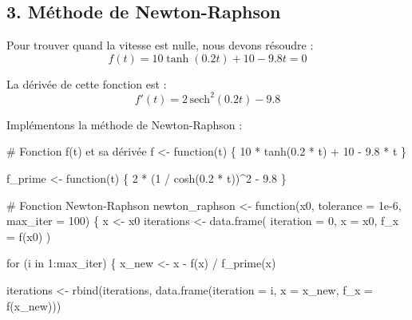 \documentclass[
  12pt,
  letterpaper,
]{book}
\newenvironment{Shaded}{}{}
\newcommand{\AttributeTok}[1]{\textcolor[rgb]{0.84,0.23,0.29}{#1}}
\newcommand{\CommentTok}[1]{\textcolor[rgb]{0.42,0.45,0.49}{#1}}
\newcommand{\ControlFlowTok}[1]{\textcolor[rgb]{0.84,0.23,0.29}{#1}}
\newcommand{\DecValTok}[1]{\textcolor[rgb]{0.00,0.36,0.77}{#1}}
\newcommand{\FloatTok}[1]{\textcolor[rgb]{0.00,0.36,0.77}{#1}}
\newcommand{\FunctionTok}[1]{\textcolor[rgb]{0.44,0.26,0.76}{#1}}
\newcommand{\NormalTok}[1]{\textcolor[rgb]{0.14,0.16,0.18}{#1}}
\newcommand{\OtherTok}[1]{\textcolor[rgb]{0.44,0.26,0.76}{#1}}
\newcommand{\SpecialCharTok}[1]{\textcolor[rgb]{0.00,0.36,0.77}{#1}}
\theoremstyle{remark}
\begin{document}
\hypertarget{muxe9thode-de-newton-raphson}{%
\subsection{3. Méthode de
Newton-Raphson}\label{muxe9thode-de-newton-raphson}}

Pour trouver quand la vitesse est nulle, nous devons résoudre :
\[f(t) = 10\tanh(0.2t) + 10 - 9.8t = 0\]

La dérivée de cette fonction est :
\[f'(t) = 2\,\text{sech}^2(0.2t) - 9.8\]

Implémentons la méthode de Newton-Raphson :

\begin{Shaded}
\begin{Highlighting}[]
\CommentTok{\# Fonction f(t) et sa dérivée}
\NormalTok{f }\OtherTok{\textless{}{-}} \ControlFlowTok{function}\NormalTok{(t) \{}
  \DecValTok{10} \SpecialCharTok{*} \FunctionTok{tanh}\NormalTok{(}\FloatTok{0.2} \SpecialCharTok{*}\NormalTok{ t) }\SpecialCharTok{+} \DecValTok{10} \SpecialCharTok{{-}} \FloatTok{9.8} \SpecialCharTok{*}\NormalTok{ t}
\NormalTok{\}}

\NormalTok{f\_prime }\OtherTok{\textless{}{-}} \ControlFlowTok{function}\NormalTok{(t) \{}
  \DecValTok{2} \SpecialCharTok{*}\NormalTok{ (}\DecValTok{1} \SpecialCharTok{/} \FunctionTok{cosh}\NormalTok{(}\FloatTok{0.2} \SpecialCharTok{*}\NormalTok{ t))}\SpecialCharTok{\^{}}\DecValTok{2} \SpecialCharTok{{-}} \FloatTok{9.8}
\NormalTok{\}}

\CommentTok{\# Fonction Newton{-}Raphson}
\NormalTok{newton\_raphson }\OtherTok{\textless{}{-}} \ControlFlowTok{function}\NormalTok{(x0, }\AttributeTok{tolerance =} \FloatTok{1e{-}6}\NormalTok{, }\AttributeTok{max\_iter =} \DecValTok{100}\NormalTok{) \{}
\NormalTok{  x }\OtherTok{\textless{}{-}}\NormalTok{ x0}
\NormalTok{  iterations }\OtherTok{\textless{}{-}} \FunctionTok{data.frame}\NormalTok{(}
    \AttributeTok{iteration =} \DecValTok{0}\NormalTok{,}
    \AttributeTok{x =}\NormalTok{ x0,}
    \AttributeTok{f\_x =} \FunctionTok{f}\NormalTok{(x0)}
\NormalTok{  )}
  
  \ControlFlowTok{for}\NormalTok{ (i }\ControlFlowTok{in} \DecValTok{1}\SpecialCharTok{:}\NormalTok{max\_iter) \{}
\NormalTok{    x\_new }\OtherTok{\textless{}{-}}\NormalTok{ x }\SpecialCharTok{{-}} \FunctionTok{f}\NormalTok{(x) }\SpecialCharTok{/} \FunctionTok{f\_prime}\NormalTok{(x)}
    
\NormalTok{    iterations }\OtherTok{\textless{}{-}} \FunctionTok{rbind}\NormalTok{(iterations, }
                       \FunctionTok{data.frame}\NormalTok{(}\AttributeTok{iteration =}\NormalTok{ i,}
                                \AttributeTok{x =}\NormalTok{ x\_new,}
                                \AttributeTok{f\_x =} \FunctionTok{f}\NormalTok{(x\_new)))}
    

\end{Highlighting}
\end{Shaded}
\end{document}
